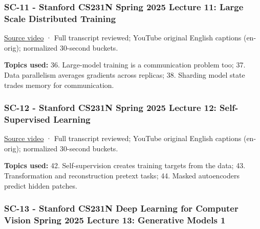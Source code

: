 \subsubsection{SC-11 - Stanford CS231N Spring 2025 Lecture 11: Large Scale Distributed Training}\label{04-visual-computing-ii-ch036-sc-11---stanford-cs231n-spring-2025-lecture-11-large-scale-distributed-training}

\hypertarget{04-visual-computing-ii-ch036-sc-11---stanford-cs231n-spring-2025-lecture-11-large-scale-distributed-training}{}

\href{https://www.youtube.com/watch?v=9MvD-XsowsE}{Source video} · Full transcript reviewed; YouTube original English captions (en-orig); normalized 30-second buckets.

\textbf{Topics used:} 36. Large-model training is a communication problem too; 37. Data parallelism averages gradients across replicas; 38. Sharding model state trades memory for communication.

\subsubsection{SC-12 - Stanford CS231N Spring 2025 Lecture 12: Self-Supervised Learning}\label{04-visual-computing-ii-ch036-sc-12---stanford-cs231n-spring-2025-lecture-12-self-supervised-learning}

\hypertarget{04-visual-computing-ii-ch036-sc-12---stanford-cs231n-spring-2025-lecture-12-self-supervised-learning}{}

\href{https://www.youtube.com/watch?v=4howBU7THbM}{Source video} · Full transcript reviewed; YouTube original English captions (en-orig); normalized 30-second buckets.

\textbf{Topics used:} 42. Self-supervision creates training targets from the data; 43. Transformation and reconstruction pretext tasks; 44. Masked autoencoders predict hidden patches.

\subsubsection{SC-13 - Stanford CS231N Deep Learning for Computer Vision Spring 2025 Lecture 13: Generative Models 1}\label{04-visual-computing-ii-ch036-sc-13---stanford-cs231n-deep-learning-for-computer-vision-spring-2025-lecture-13-generative-models-1}

\hypertarget{04-visual-computing-ii-ch036-sc-13---stanford-cs231n-deep-learning-for-computer-vision-spring-2025-lecture-13-generative-models-1}{}

